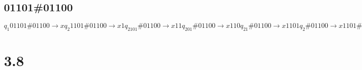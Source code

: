 \documentclass{scrartcl}
\begin{document}
\subsection*{01101\#01100}
$q_1 01101\#01100 \to xq_2 1101\#01100 \to x1q_2101\#01100 \to x11q_201\#01100
\to x110q_21\#01100 \to x1101q_2\#01100 \to x1101\#q_401100 \to x1101q_6\#x1100
\to x110q_71\#x1100 \to x11q_701\#x1100 \to x1q_7101\#x1100 \to xq_71101\#x1100
\to q_7x1101\#x1100 \to xq_11101\#x1100 \to xxq_3101\#x1100 \to xx1q_301\#x1100
\to xx10q_31\#x1100 \to xx101q_3\#x1100 \to xx101\#q_5x1100 \to xx101\#xq_51100
\to xx101\#q_6xx100 \to xx101q_6\#xx100 \to xx10q_71\#xx100 \to xx1q_701\#xx100
\to xxq_7101\#xx100 \to xq_7x101\#xx100 \to xxq_1101\#xx100 \to xxxq_301\#xx100
\to xxx0q_31\#xx100 \to xxx01q_3\#xx100 \to xxx01\#q_5xx100 \to xxx01\#xq_5x100
\to xxx01\#xxq_5100 \to xxx01\#xq_6xx00 \to xxx01\#q_6xxx00 \to xxx01q_6\#xxx00
\to xxx0q_71\#xxx00 \to xxxq_701\#xxx00 \to xxq_7x01\#xxx00 \to xxxq_101\#xxx00
\to xxxxq_21\#xxx00 \to xxxx1q_2\#xxx00 \to xxxx1\#q_4xxx00 \to xxxx1\#xq_4xx00
\to xxxx1\#xxq_4x00 \to xxxx1\#xxxq_400 \to xxxx1\#xxq_6xx0 \to xxxx1\#xq_6xxx0
\to xxxx1\#q_6xxxx0 \to xxxx1q_6\#xxxx0 \to xxxxq_71\#xxxx0 \to xxxq_7x1\#xxxx0
\to xxxxq_11\#xxxx0 \to xxxxxq_3\#xxxx0 \to xxxxx\#q_5xxxx0 \to xxxxx\#xq_5xxx0
\to xxxxx\#xxq_5xx0 \to xxxxx\#xxxq_5x0 \to xxxxx\#xxxxq_50 \to xxxxx\#xxxxq_{reject}0$

\section*{3.8}
\end{document}
